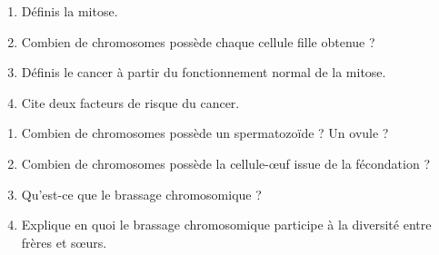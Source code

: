 \begin{enumerate}[label=\arabic*)]
\item Définis la mitose.
\item Combien de chromosomes possède chaque cellule fille obtenue ?
\item Définis le cancer à partir du fonctionnement normal de la mitose.
\item Cite deux facteurs de risque du cancer.
\end{enumerate}

\begin{enumerate}[label=\arabic*)]
\item Combien de chromosomes possède un spermatozoïde ? Un ovule ?
\item Combien de chromosomes possède la cellule-œuf issue de la fécondation ?
\item Qu'est-ce que le brassage chromosomique ?
\item Explique en quoi le brassage chromosomique participe à la diversité entre frères
et sœurs.
\end{enumerate}

